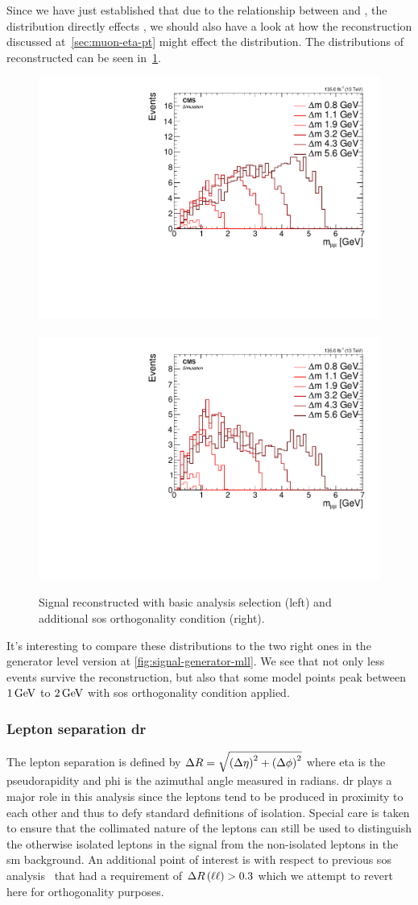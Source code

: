 Since we have just established that due to the relationship between \pt and \mll, the \pt distribution directly effects \mll, we should also have a look at how the reconstruction discussed at~\ref{sec:muon-eta-pt} might effect the \mmumu distribution. The distributions of reconstructed \mmumu can be seen in~\ref{fig:reco-signal-invamass}.

\begin{figure}[!htb]
\centering
\includegraphics[width=0.48\linewidth]{plots/signal_muons/none_invMassCorrJetNoMultIso10Dr0.6.pdf} \,
\includegraphics[width=0.48\linewidth]{plots/signal_muons/none_invMassCorrJetNoMultIso10Dr0.6_orth.pdf}  \\
\caption[Signal reconstructed \mmumu]{ Signal reconstructed \mmumu with basic analysis selection (left) and additional \gls{sos} orthogonality condition (right).}
\label{fig:reco-signal-invamass}
\end{figure}

It's interesting to compare these distributions to the two right ones in the generator level version at \ref{fig:signal-generator-mll}. We see that not only less events survive the reconstruction, but also that some \dm model points peak between $1 \,\text{Ge\hspace{-.08em}V}$ to $2 \,\text{Ge\hspace{-.08em}V}$ with \gls{sos} orthogonality condition applied.

\subsubsection{Lepton separation \gls{dr}}
\label{sec:lepton-dr}

The lepton separation is defined by $\Delta R=\sqrt{\left(\Delta\eta\right)^2+\left(\Delta\phi\right)^2}$ where \gls{eta} is the pseudorapidity and \gls{phi} is the azimuthal angle measured in radians. \gls{dr} plays a major role in this analysis since the leptons tend to be produced in proximity to each other and thus to defy standard definitions of isolation. Special care is taken to ensure that the collimated nature of the leptons can still be used to distinguish the otherwise isolated leptons in the signal from the non-isolated leptons in the \gls{sm} background. An additional point of interest is with respect to previous \gls{sos} analysis~\citep{sos} that had a requirement of $\Delta R\left(\ell\ell\right) > 0.3$ which we attempt to revert here for orthogonality purposes. 

